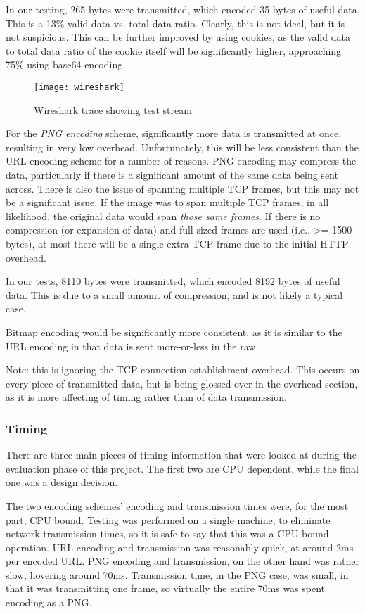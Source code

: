 In our testing, 265 bytes were transmitted, which encoded 35 bytes of useful data. This is a 13\% valid data vs. total data ratio. Clearly, this is not ideal, but it is not suspicious. This can be further improved by using cookies, as the valid data to total data ratio of the cookie itself will be significantly higher, approaching 75\% using base64 encoding.

\begin{figure}
\centering
\texttt{[image: wireshark]}
\caption{Wireshark trace showing test stream}
\label{fig:wireshark}
\end{figure}

For the \emph{PNG encoding} scheme, significantly more data is transmitted at once, resulting in very low overhead. Unfortunately, this will be less consistent than the URL encoding scheme for a number of reasons. PNG encoding may compress the data, particularly if there is a significant amount of the same data being sent across. There is also the issue of spanning multiple TCP frames, but this may not be a significant issue. If the image was to span multiple TCP frames, in all likelihood, the original data would span \emph{those same frames}. If there is no compression (or expansion of data) and full sized frames are used (i.e., >= 1500 bytes), at most there will be a single extra TCP frame due to the initial HTTP overhead.

In our tests, 8110 bytes were transmitted, which encoded 8192 bytes of useful data. This is due to a small amount of compression, and is not likely a typical case.  

Bitmap encoding would be significantly more consistent, as it is similar to the URL encoding in that data is sent more-or-less in the raw.
	
Note: this is ignoring the TCP connection establishment overhead. This occurs on every piece of transmitted data, but is being glossed over in the overhead section, as it is more affecting of timing rather than of data transmission. 

\subsubsection{Timing}
There are three main pieces of timing information that were looked at during the evaluation phase of this project. The first two are CPU dependent, while the final one was a design decision. 

The two encoding schemes' encoding and transmission times were, for the most part, CPU bound. Testing was performed on a single machine, to eliminate network transmission times, so it is safe to say that this was a CPU bound operation. URL encoding and transmission was reasonably quick, at around 2ms per encoded URL. PNG encoding and transmission, on the other hand was rather slow, hovering around 70ms. Transmission time, in the PNG case, was small, in that it was transmitting one frame, so virtually the entire 70ms was spent encoding as a PNG.

